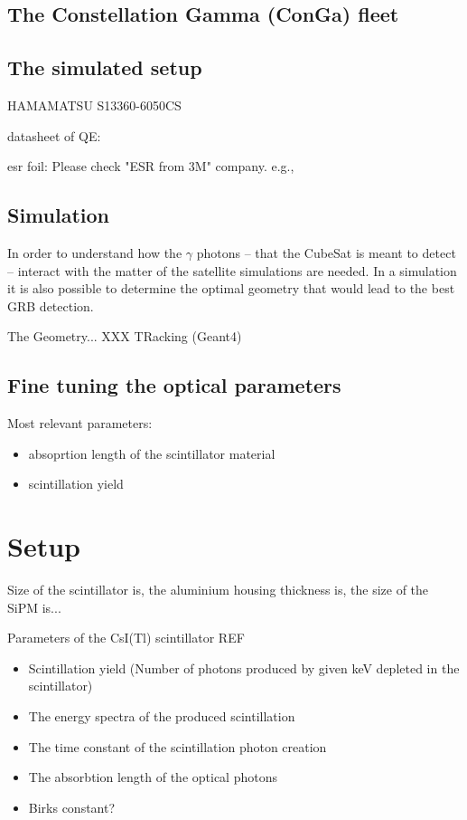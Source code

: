 \documentclass[12pt, a4paper,titlepage]{article}
\numberwithin{equation}{section}
\numberwithin{figure}{section}
\begin{document}
\subsection{The Constellation Gamma (ConGa) fleet}

\subsection{The simulated setup}


HAMAMATSU S13360-6050CS

datasheet of QE:

esr foil:
Please check "ESR from 3M" company. e.g.,

\subsection{Simulation}

In order to understand how the $\gamma$ photons -- that the CubeSat is meant to detect -- interact with the matter of the satellite simulations are needed. In a simulation it is also possible to determine the optimal geometry that would lead to the best GRB detection. 

The Geometry... XXX TRacking (Geant4) 

\subsection{Fine tuning the optical parameters}

Most relevant parameters:
\begin{itemize}
\item absoprtion length of the scintillator material
\item scintillation yield
\end{itemize}

\section{Setup}

Size of the scintillator is, the aluminium housing thickness is, the size of the SiPM is...

Parameters of the CsI(Tl) scintillator REF

\begin{itemize}
\item Scintillation yield (Number of photons produced by given keV depleted in the scintillator)
\item The energy spectra of the produced scintillation
\item The time constant of the scintillation photon creation
\item The absorbtion length of the optical photons
\item Birks constant?
\end{itemize}
\end{document}
